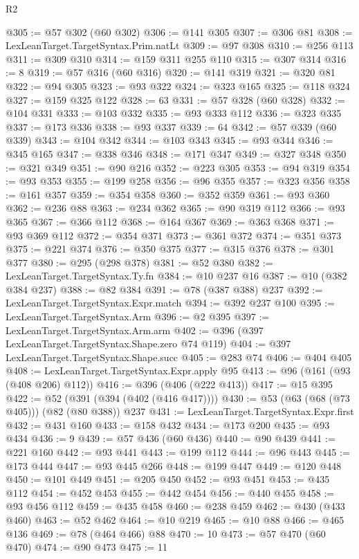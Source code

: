 \begin{lexlean}{R2}
\begin{coremodule}
@305 := @57 @302 (@60 @302)
@306 := @141 @305
@307 := @306 @81
@308 := LexLeanTarget.TargetSyntax.Prim.natLt
@309 := @97 @308
@310 := @256 @113
@311 := @309 @310
@314 := @159 @311 @255 @110
@315 := @307 @314
@316 := 8
@319 := @57 @316 (@60 @316)
@320 := @141 @319
@321 := @320 @81
@322 := @94 @305
@323 := @93 @322
@324 := @323 @165
@325 := @118 @324
@327 := @159 @325 @122
@328 := 63
@331 := @57 @328 (@60 @328)
@332 := @104 @331
@333 := @103 @332
@335 := @93 @333 @112
@336 := @323 @335
@337 := @173 @336
@338 := @93 @337
@339 := 64
@342 := @57 @339 (@60 @339)
@343 := @104 @342
@344 := @103 @343
@345 := @93 @344
@346 := @345 @165
@347 := @338 @346
@348 := @171 @347
@349 := @327 @348
@350 := @321 @349
@351 := @90 @216
@352 := @223 @305
@353 := @94 @319
@354 := @93 @353
@355 := @199 @258
@356 := @96 @355
@357 := @323 @356
@358 := @161 @357
@359 := @354 @358
@360 := @352 @359
@361 := @93 @360
@362 := @236 @88
@363 := @234 @362
@365 := @90 @319 @112
@366 := @93 @365
@367 := @366 @112
@368 := @164 @367
@369 := @363 @368
@371 := @93 @369 @112
@372 := @354 @371
@373 := @361 @372
@374 := @351 @373
@375 := @221 @374
@376 := @350 @375
@377 := @315 @376
@378 := @301 @377
@380 := @295 (@298 @378)
@381 := @52 @380
@382 := LexLeanTarget.TargetSyntax.Ty.fn
@384 := @10 @237 @16
@387 := @10 (@382 @384 @237)
@388 := @82 @384
@391 := @78 (@387 @388) @237
@392 := LexLeanTarget.TargetSyntax.Expr.match
@394 := @392 @237 @100
@395 := LexLeanTarget.TargetSyntax.Arm
@396 := @2 @395
@397 := LexLeanTarget.TargetSyntax.Arm.arm
@402 := @396 (@397 LexLeanTarget.TargetSyntax.Shape.zero @74 @119)
@404 := @397 LexLeanTarget.TargetSyntax.Shape.succ
@405 := @283 @74
@406 := @404 @405
@408 := LexLeanTarget.TargetSyntax.Expr.apply @95
@413 := @96 (@161 (@93 (@408 @206) @112))
@416 := @396 (@406 (@222 @413))
@417 := @15 @395
@422 := @52 (@391 (@394 (@402 (@416 @417))))
@430 := @53 (@63 (@68 (@73 @405))) (@82 (@80 @388)) @237
@431 := LexLeanTarget.TargetSyntax.Expr.first
@432 := @431 @160
@433 := @158 @432
@434 := @173 @200
@435 := @93 @434
@436 := 9
@439 := @57 @436 (@60 @436)
@440 := @90 @439
@441 := @221 @160
@442 := @93 @441
@443 := @199 @112
@444 := @96 @443
@445 := @173 @444
@447 := @93 @445 @266
@448 := @199 @447
@449 := @120 @448
@450 := @101 @449
@451 := @205 @450
@452 := @93 @451
@453 := @435 @112
@454 := @452 @453
@455 := @442 @454
@456 := @440 @455
@458 := @93 @456 @112
@459 := @435 @458
@460 := @238 @459
@462 := @430 (@433 @460)
@463 := @52 @462
@464 := @10 @219
@465 := @10 @88
@466 := @465 @136
@469 := @78 (@464 @466) @88
@470 := 10
@473 := @57 @470 (@60 @470)
@474 := @90 @473
@475 := 11

\end{coremodule}
\end{lexlean}
